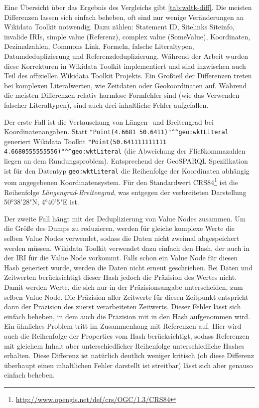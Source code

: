 Eine Übersicht über das Ergebnis des Vergleichs gibt \cref{tab:wdtk-diff}.
Die meisten Differenzen lassen sich einfach beheben, oft sind nur wenige Veränderungen an Wikidata Toolkit notwendig. Dazu zählen: Statement ID, Sitelinks Siteinfo, invalide IRIs, simple value (Referenz), complex value (SomeValue), Koordinaten, Dezimalzahlen, Commons Link, Formeln, falsche Literaltypen, Datumdeduplizierung und Referenzdeduplizierung.
Während der Arbeit wurden diese Korrekturen in Wikidata Toolkit implementiert und sind inzwischen auch Teil des offiziellen Wikidata Toolkit Projekts.
Ein Großteil der Differenzen treten bei komplexen Literalwerten, wie Zeitdaten oder Geokoordinaten auf.
Während die meisten Differenzen relativ harmlose Formfehler sind (wie das Verwenden falscher Literaltypen), sind auch drei inhaltliche Fehler aufgefallen.

Der erste Fall ist die Vertauschung von Längen- und Breitengrad bei Koordinatenangaben.
Statt \verb|"Point(4.6681 50.6411)"^^geo:wktLiteral| generiert Wikidata Toolkit \verb|"Point(50.641111111111 4.6680555555556)"^^geo:wktLiteral| (die Abweichung der Fließkommazahlen liegen an dem Rundungsproblem). Entsprechend der GeoSPARQL Spezifikation\cite{spec:geosparql} ist für den Datentyp \verb|geo:wktLiteral| die Reihenfolge der Koordinaten abhängig vom angegebenen Koordinatensystem.
Für den Standardwert CRS84\footnote{\url{http://www.opengis.net/def/crs/OGC/1.3/CRS84}} ist die Reihenfolge \emph{Längengrad}-\emph{Breitengrad}, was entgegen der verbreiteten Darstellung 50°38'28"N, 4°40'5"E ist.

Der zweite Fall hängt mit der Deduplizierung von Value Nodes zusammen.
Um die Größe des Dumps zu reduzieren, werden für gleiche komplexe Werte die selben Value Nodes verwendet, sodass die Daten nicht zweimal abgespeichert werden müssen.
Wikidata Toolkit verwendet dazu einfach den Hash, der auch in der IRI für die Value Node vorkommt.
Falls schon ein Value Node für diesen Hash generiert wurde, werden die Daten nicht erneut geschrieben.
Bei Daten und Zeitwerten berücksichtigt dieser Hash jedoch die Präzision des Wertes nicht.
Damit werden Werte, die sich nur in der Präzisionsangabe unterscheiden, zum selben Value Node.
Die Präzision aller Zeitwerte für diesen Zeitpunkt entspricht dann der Präzision des zuerst verarbeiteten Zeitwerts.
Dieser Fehler lässt sich einfach beheben, in dem auch die Präzision mit in den Hash aufgenommen wird.
Ein ähnliches Problem tritt im Zusammenhang mit Referenzen auf.
Hier wird auch die Reihenfolge der Properties vom Hash berücksichtigt, sodass Referenzen mit gleichem Inhalt aber unterschiedlicher Reihenfolge unterschiedliche Hashes erhalten.
Diese Differenz ist natürlich deutlich weniger kritisch (ob diese Differenz überhaupt einen inhaltlichen Fehler darstellt ist streitbar) lässt sich aber genauso einfach beheben.

